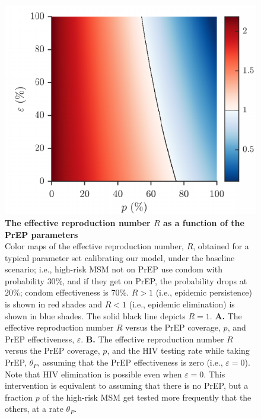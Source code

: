 \documentclass[12pt]{article}
\begin{document}
\newpage
\begin{figure}[H]
	\centering
	\includegraphics{Figures/Fig_S3}
	\caption[The effective reproduction number $R$ as a function of the PrEP parameters]{%
		{\bf {} The effective reproduction number $R$ as a function of the PrEP parameters}\\
	Color maps of the effective reproduction number, $R$, obtained for a typical parameter set calibrating our model, under the baseline scenario; i.e., high-risk MSM not on PrEP use condom with probability $30\%$, and if they get on PrEP, the probability drops at $20\%$; condom effectiveness is $70\%$. $R>1$ (i.e., epidemic persistence) is shown in red shades and $R<1$ (i.e., epidemic elimination) is shown in blue shades. The solid black line depicts $R=1$. {\bf A.}  The effective reproduction number $R$ versus the PrEP coverage, $p$, and PrEP effectiveness, $\varepsilon$. {\bf B.} The effective reproduction number $R$ versus the PrEP coverage, $p$, and the HIV testing rate while taking PrEP, $\theta_P$, assuming that the PrEP effectiveness is zero (i.e., $\varepsilon=0$). Note that HIV elimination is possible even when $\varepsilon=0$. This intervention is equivalent to assuming that there is no PrEP, but a fraction $p$ of the high-risk MSM get tested more frequently that the others, at a rate $\theta_P$.}
	\label{fig:R}
\end{figure}
\end{document}

